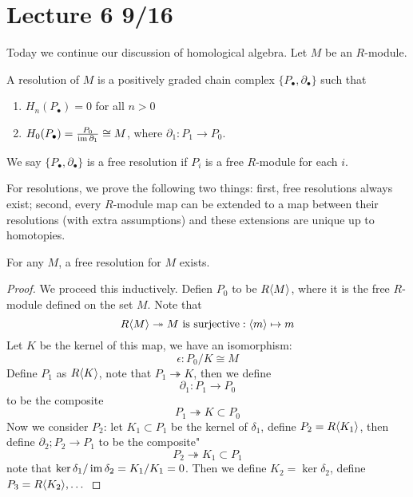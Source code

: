 
\section{Lecture 6 9/16}
Today we continue our discussion of homological algebra. Let $M$ be an $R$-module. 
\begin{defn}[resolution]
    A resolution of $M$ is a positively graded chain complex $\{P_\bullet, \partial_\bullet\}$ such that 
    \begin{enumerate}
        \item $H_n(P_\bullet)=0$ for all $n>0$
        \item $H_0(P_\bullet)=\frac{P_0}{\operatorname{im}\partial_1}\cong M$, where $\partial_1:P_1\to P_0$.
    \end{enumerate}
    We say $\{P_\bullet,\partial_\bullet\}$ is a free resolution if $P_i$ is a free $R$-module for each $i$.
\end{defn}
For resolutions, we prove the following two things: first, free resolutions always exist; second, every $R$-module map can be extended to a map between their resolutions (with extra assumptions) and these extensions are unique up to homotopies.
\begin{prop}
    For any $M$, a free resolution for $M$ exists.
\end{prop}
\begin{proof}
    We proceed this inductively. Defien $P_0$ to be $R\langle M\rangle$, where it is the free $R$-module defined on the set $M$. Note that 
    \begin{equation*}
        R\langle M\rangle\twoheadrightarrow M \text{ is surjective}: \langle m\rangle\mapsto m
    \end{equation*}
    Let $K$ be the kernel of this map, we have an isomorphism:
    \begin{equation*}
        \epsilon: P_0/K\cong M
    \end{equation*}
    Define $P_1$ as $R\langle K\rangle$, note that $P_1\twoheadrightarrow K$, then we define 
    \begin{equation*}
        \partial_1: P_1\to P_0
    \end{equation*}
    to be the composite 
    \begin{equation*}
        P_1\twoheadrightarrow K\subset P_0
    \end{equation*}
    Now we consider $P_2$: let $K_1\subset P_1$ be the kernel of $\delta_1$, define $P_2=R\langle K_1\rangle$, then define $\partial_2; P_2\to P_1$ to be the composite"
    \begin{equation*}
        P_2\twoheadrightarrow K_1\subset P_1
    \end{equation*}
    note that $\ker\delta_1/\operatorname{im}\delta_2=K_1/K_1=0$. Then we define $K_2=\ker\delta_2$, define $P_3=R\langle K_2\rangle, \dots$
\end{proof}
